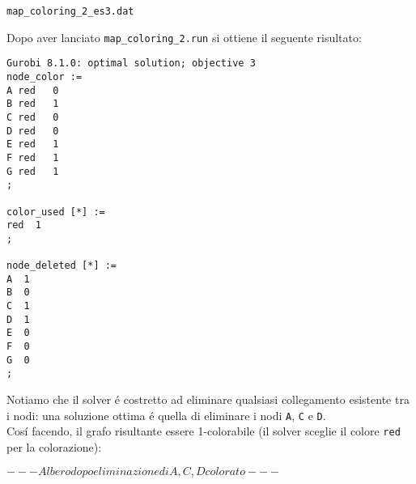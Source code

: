 \documentclass{article}
\begin{document}
\texttt{map\_coloring\_2\_es3.dat}


Dopo aver lanciato \texttt{map\_coloring\_2.run} si ottiene il seguente risultato:\\

\begin{verbatim}
Gurobi 8.1.0: optimal solution; objective 3
node_color :=
A red   0
B red   1
C red   0
D red   0
E red   1
F red   1
G red   1
;

color_used [*] :=
red  1
;

node_deleted [*] :=
A  1
B  0
C  1
D  1
E  0
F  0
G  0
;
\end{verbatim}

Notiamo che il solver \'e costretto ad eliminare qualsiasi collegamento esistente tra i nodi: una soluzione ottima \'e quella di eliminare i nodi \texttt{A}, \texttt{C} e \texttt{D}.\\
Cos\'i facendo, il grafo risultante essere 1-colorabile (il solver sceglie il colore \texttt{red} per la colorazione):

$ --- Albero dopo eliminazione di A, C, D colorato --- $
\end{document}
